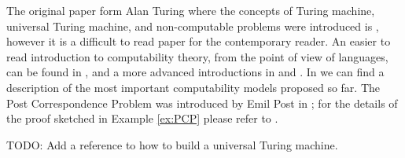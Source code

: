 The original paper form Alan Turing where the concepts of Turing machine, universal Turing machine, and non-computable problems were introduced is \cite{turing1936computable}, however it is a difficult to read paper for the contemporary reader. An easier to read introduction to computability theory, from the point of view of languages, can be found in \cite{sipser2012introduction}, and a more advanced introductions in \cite{cooper2003computability} and \cite{soare2016turing}. In \cite{fernandez2009models} we can find a description of the most important computability models proposed so far. The Post Correspondence Problem was introduced by Emil Post in \cite{post1946variant}; for the details of the proof sketched in Example \ref{ex:PCP} please refer to \cite{sipser2012introduction}.

{\color{red} TODO: Add a reference to how to build a universal Turing machine.}

